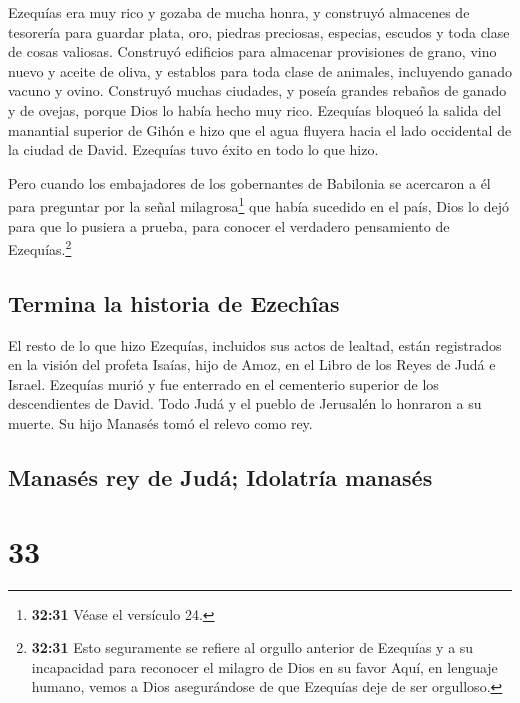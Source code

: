  Ezequías era muy rico y gozaba de mucha honra, y
construyó almacenes de tesorería para guardar plata, oro, piedras
preciosas, especias, escudos y toda clase de cosas valiosas.
 Construyó edificios para almacenar provisiones de grano,
vino nuevo y aceite de oliva, y establos para toda clase de animales,
incluyendo ganado vacuno y ovino.  Construyó muchas
ciudades, y poseía grandes rebaños de ganado y de ovejas, porque Dios lo
había hecho muy rico.  Ezequías bloqueó la salida del
manantial superior de Gihón e hizo que el agua fluyera hacia el lado
occidental de la ciudad de David. Ezequías tuvo éxito en todo lo que
hizo.

 Pero cuando los embajadores de los gobernantes de
Babilonia se acercaron a él para preguntar por la señal
milagrosa\footnote{\textbf{32:31} Véase el versículo 24.} que había
sucedido en el país, Dios lo dejó para que lo pusiera a prueba, para
conocer el verdadero pensamiento de Ezequías.\footnote{\textbf{32:31}
  Esto seguramente se refiere al orgullo anterior de Ezequías y a su
  incapacidad para reconocer el milagro de Dios en su favor Aquí, en
  lenguaje humano, vemos a Dios asegurándose de que Ezequías deje de ser
  orgulloso.}

\hypertarget{termina-la-historia-de-ezechuxeeas}{%
\subsection{Termina la historia de
Ezechîas}\label{termina-la-historia-de-ezechuxeeas}}

 El resto de lo que hizo Ezequías, incluidos sus actos de
lealtad, están registrados en la visión del profeta Isaías, hijo de
Amoz, en el Libro de los Reyes de Judá e Israel. 
Ezequías murió y fue enterrado en el cementerio superior de los
descendientes de David. Todo Judá y el pueblo de Jerusalén lo honraron a
su muerte. Su hijo Manasés tomó el relevo como rey.

\hypertarget{manasuxe9s-rey-de-juduxe1-idolatruxeda-manasuxe9s}{%
\subsection{Manasés rey de Judá; Idolatría
manasés}\label{manasuxe9s-rey-de-juduxe1-idolatruxeda-manasuxe9s}}

\hypertarget{section-32}{%
\section{33}\label{section-32}}

